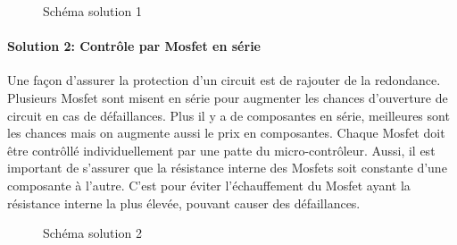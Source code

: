 		\begin{figure}[H]
			\centering
			\caption[Solution 1]{Schéma solution 1}
			\label{fig:contactorsol1}
		\end{figure}
		
		
		\paragraph*{Solution 2: Contrôle par Mosfet en série}
		Une façon d'assurer la protection d'un circuit est de rajouter de la redondance. Plusieurs Mosfet sont misent en série pour augmenter les chances d'ouverture de circuit en cas de défaillances. Plus il y a de composantes en série, meilleures sont les chances mais on augmente aussi le prix en composantes. Chaque Mosfet doit être contrôllé individuellement par une patte du micro-contrôleur. Aussi, il est important de s'assurer que la résistance interne des Mosfets soit constante d'une composante à l'autre. C'est pour éviter l'échauffement du Mosfet ayant la résistance interne la plus élevée, pouvant causer des défaillances.
		
		\begin{figure}[H]
			\centering
			\caption[Solution 2]{Schéma solution 2}
			\label{fig:contactorsol2}
		\end{figure}
		
		

